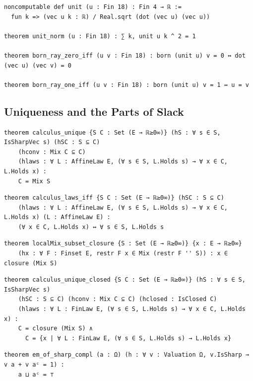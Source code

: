 \label{lean:born-ray}
\begin{lstlisting}
noncomputable def unit (u : Fin 18) : Fin 4 → ℝ :=
  fun k => (vec u k : ℝ) / Real.sqrt (dot (vec u) (vec u))

theorem unit_norm (u : Fin 18) : ∑ k, unit u k ^ 2 = 1

theorem born_ray_zero_iff (u v : Fin 18) : born (unit u) v = 0 ↔ dot (vec u) (vec v) = 0

theorem born_ray_one_iff (u v : Fin 18) : born (unit u) v = 1 ↔ u = v
\end{lstlisting}

\subsection{Uniqueness and the Parts of Slack}

\label{lean:calculus-unique}
\begin{lstlisting}
theorem calculus_unique {S C : Set (E → ℝ≥0∞)} (hS : ∀ s ∈ S, IsSharpVec s) (hSC : S ⊆ C)
    (hconv : Mix C ⊆ C)
    (hlaws : ∀ L : AffineLaw E, (∀ s ∈ S, L.Holds s) → ∀ x ∈ C, L.Holds x) :
    C = Mix S
\end{lstlisting}

\label{lean:calculus-laws-iff}
\begin{lstlisting}
theorem calculus_laws_iff {S C : Set (E → ℝ≥0∞)} (hSC : S ⊆ C)
    (hlaws : ∀ L : AffineLaw E, (∀ s ∈ S, L.Holds s) → ∀ x ∈ C, L.Holds x) (L : AffineLaw E) :
    (∀ x ∈ C, L.Holds x) ↔ ∀ s ∈ S, L.Holds s
\end{lstlisting}

\label{lean:localmix-subset-closure}
\begin{lstlisting}
theorem localMix_subset_closure {S : Set (E → ℝ≥0∞)} {x : E → ℝ≥0∞}
    (hx : ∀ F : Finset E, restr F x ∈ Mix (restr F '' S)) : x ∈ closure (Mix S)
\end{lstlisting}

\label{lean:calculus-unique-closed}
\begin{lstlisting}
theorem calculus_unique_closed {S C : Set (E → ℝ≥0∞)} (hS : ∀ s ∈ S, IsSharpVec s)
    (hSC : S ⊆ C) (hconv : Mix C ⊆ C) (hclosed : IsClosed C)
    (hlaws : ∀ L : FinLaw E, (∀ s ∈ S, L.Holds s) → ∀ x ∈ C, L.Holds x) :
    C = closure (Mix S) ∧
      C = {x | ∀ L : FinLaw E, (∀ s ∈ S, L.Holds s) → L.Holds x}
\end{lstlisting}

\label{lean:em-of-sharp-compl}
\begin{lstlisting}
theorem em_of_sharp_compl (a : Ω) (h : ∀ v : Valuation Ω, v.IsSharp → v a + v aᶜ = 1) :
    a ⊔ aᶜ = ⊤
\end{lstlisting}

